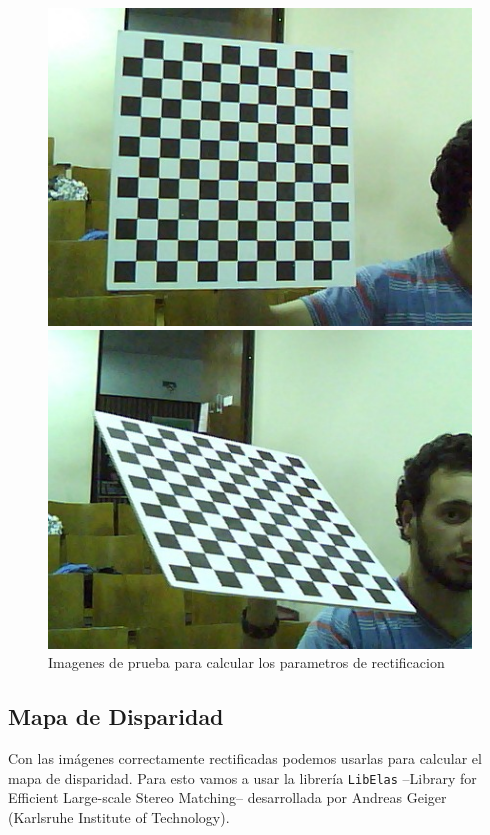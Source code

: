 \documentclass[journal,a4paper]{IEEEtran}
\begin{document}
\begin{figure}[h!]
    \centering
    \includegraphics[width=0.8\linewidth]{calibracion1.jpg}
    
    \medskip
    
    \includegraphics[width=0.8\linewidth]{calibracion2.jpg}
    \caption{Imagenes de prueba para calcular los parametros de rectificacion}
    \label{fig_calibracion}
\end{figure}

\subsection{Mapa de Disparidad}
Con las imágenes correctamente rectificadas podemos usarlas para calcular el mapa de disparidad.
Para esto vamos a usar la librería \texttt{LibElas} --Library for Efficient Large-scale Stereo Matching-- desarrollada por Andreas Geiger (Karlsruhe Institute of Technology).
\end{document}
